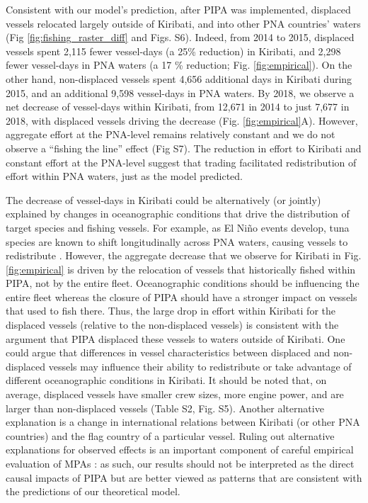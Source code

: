 \documentclass[12pt]{article}
\begin{document}
Consistent with our model's prediction, after PIPA was implemented, displaced vessels relocated largely outside of Kiribati, and into other PNA countries' waters (Fig \ref{fig:fishing_raster_diff} and Figs. S6). Indeed, from 2014 to 2015, displaced vessels spent 2,115 fewer vessel-days (a 25\% reduction) in Kiribati, and 2,298 fewer vessel-days in PNA waters (a 17 \% reduction; Fig. \ref{fig:empirical}). On the other hand, non-displaced vessels spent 4,656 additional days in Kiribati during 2015, and an additional 9,598 vessel-days in PNA waters. By 2018, we observe a net decrease of vessel-days within Kiribati, from 12,671 in 2014 to just 7,677 in 2018, with displaced vessels driving the decrease (Fig. \ref{fig:empirical}A). However, aggregate effort at the PNA-level remains relatively constant and we do not observe a ``fishing the line'' effect (Fig S7). The reduction in effort to Kiribati and constant effort at the PNA-level suggest that trading facilitated redistribution of effort within PNA waters, just as the model predicted.

The decrease of vessel-days in Kiribati could be alternatively (or jointly) explained by changes in oceanographic conditions that drive the distribution of target species and fishing vessels. For example, as El Ni\~no events develop, tuna species are known to shift longitudinally across PNA waters, causing vessels to redistribute \cite{aqorau_2018,hanich2018unraveling}. However, the aggregate decrease that we observe for Kiribati in Fig. \ref{fig:empirical} is driven by the relocation of vessels that historically fished within PIPA, not by the entire fleet. Oceanographic conditions should be influencing the entire fleet whereas the closure of PIPA should have a stronger impact on vessels that used to fish there. Thus, the large drop in effort within Kiribati for the displaced vessels (relative to the non-displaced vessels) is consistent with the argument that PIPA displaced these vessels to waters outside of Kiribati. One could argue that differences in vessel characteristics between displaced and non-displaced vessels may influence their ability to redistribute or take advantage of different oceanographic conditions in Kiribati. It should be noted that, on average, displaced vessels have smaller crew sizes, more engine power, and are larger than non-displaced vessels (Table S2, Fig. S5). Another alternative explanation is a change in international relations between Kiribati (or other PNA countries) and the flag country of a particular vessel. Ruling out alternative explanations for observed effects is an important component of careful empirical evaluation of MPAs \cite{ferraro2018causal}: as such, our results should not be interpreted as the direct causal impacts of PIPA but are better viewed as patterns that are consistent with the predictions of our theoretical model.
\end{document}
